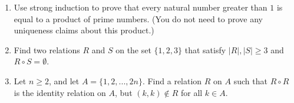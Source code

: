 \documentclass{article}
\begin{document}
{\begin{enumerate}[labelindent=0pt,leftmargin=0pt]
    Inductive Step: Let $k \geq 2$ be given and assume $\prod_{k=2}^n\frac{k^2-1}{k^2}=\frac{n+1}{2n}$ holds for $n=k$.
    

    Thus $\prod_{k=2}^{k+1}\frac{k^2-1}{k^2}=(\prod_{k=2}^k\frac{k^2-1}{k^2}) * \frac{(k+1)^2-1}{(k+1)^2}$ 
   
    $=(\frac{n+1}{2n}) * \frac{(k+1)^2-1}{(k+1)^2}$ (By induction hypothesis)

    $=\frac{k+1}{2k} * \frac{(k+1)^2-1}{(k+1)^2}$ (By assumption) 

    $=\frac{k+2}{2(k+1)}$ $=\frac{(k+1)+1}{2(k+1)}$ (By algebra)

    Thus $\prod_{k=2}^n\frac{k^2-1}{k^2}=\frac{n+1}{2n}$ holds for $n=k+1$ and the proof of the induction step is complete. 

    By induction the statement $\prod_{k=2}^n\frac{k^2-1}{k^2}=\frac{n+1}{2n}$ holds for all $n\geq 2$
    




    \item Use strong induction to prove that every natural number greater than $1$ is equal to a product of prime numbers. (You do not need to prove any uniqueness claims about this product.)




    \item Find two relations $R$ and $S$ on the set $\{1,2,3\}$ that satisfy $|R|,|S|\geq 3$ and $R\circ S=\emptyset$.




    \item Let $n\geq 2$, and let $A=\{1,2,...,2n\}$. Find a relation $R$ on $A$ such that $R\circ R$ is the identity relation on $A$, but $(k,k)\not\in R$ for all $k\in A$.

\end{enumerate}

}
\end{document}
